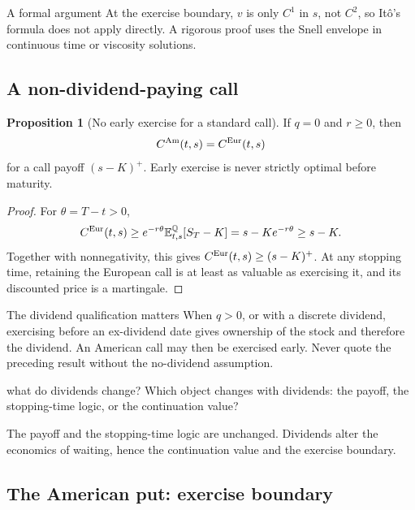 \documentclass[10pt]{article}
\newcommand{\E}{\mathbb E}
\newcommand{\Q}{\mathbb Q}
\newcommand{\1}{\mathbf 1}
\theoremstyle{definition}
\newtheorem{proposition}[definition]{Proposition}
\begin{document}
\begin{warningbox}{A formal argument}
At the exercise boundary, \(v\) is only \(C^1\) in \(s\), not \(C^2\), so
It\^o's formula does not apply directly. A rigorous proof uses the Snell
envelope in continuous time or viscosity solutions.
\end{warningbox}

\subsection{A non-dividend-paying call}
\label{sec:calls}

\begin{proposition}[No early exercise for a standard call]
If \(q=0\) and \(r\geq0\), then
\[
C^{\rm Am}(t,s)=C^{\rm Eur}(t,s)
\]
for a call payoff \((s-K)^+\). Early exercise is never strictly optimal
before maturity.
\end{proposition}
\begin{proof}
For \(\theta=T-t>0\),
\[
C^{\rm Eur}(t,s)
\geq e^{-r\theta}\E^\Q_{t,s}[S_T-K]
=s-Ke^{-r\theta}\geq s-K.
\]
Together with nonnegativity, this gives
\(C^{\rm Eur}(t,s)\geq(s-K)^+\). At any stopping time, retaining the
European call is at least as valuable as exercising it, and its discounted
price is a martingale.
\end{proof}

\begin{warningbox}{The dividend qualification matters}
When \(q>0\), or with a discrete dividend, exercising before an
ex-dividend date gives ownership of the stock and therefore the dividend.
An American call may then be exercised early. Never quote the preceding
result without the no-dividend assumption.
\end{warningbox}

\begin{studentexercise}{what do dividends change?}
Which object changes with dividends: the payoff, the stopping-time logic, or
the continuation value?
\end{studentexercise}
\begin{shortsolution}
The payoff and the stopping-time logic are unchanged. Dividends alter the
economics of waiting, hence the continuation value and the exercise boundary.
\end{shortsolution}

\subsection{The American put: exercise boundary}
\end{document}
